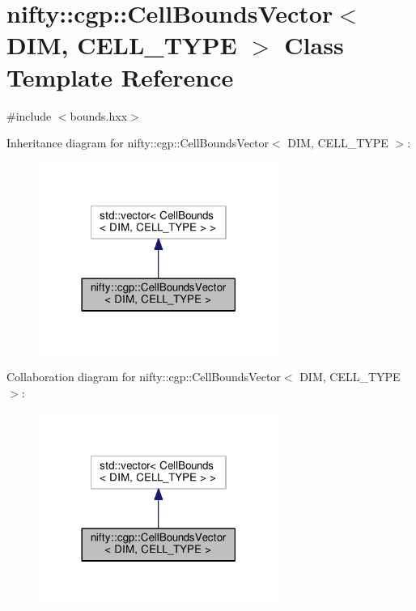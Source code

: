 \hypertarget{classnifty_1_1cgp_1_1CellBoundsVector}{}\section{nifty\+:\+:cgp\+:\+:Cell\+Bounds\+Vector$<$ D\+I\+M, C\+E\+L\+L\+\_\+\+T\+Y\+P\+E $>$ Class Template Reference}
\label{classnifty_1_1cgp_1_1CellBoundsVector}


{\ttfamily \#include $<$bounds.\+hxx$>$}



Inheritance diagram for nifty\+:\+:cgp\+:\+:Cell\+Bounds\+Vector$<$ D\+I\+M, C\+E\+L\+L\+\_\+\+T\+Y\+P\+E $>$\+:\nopagebreak
\begin{figure}[H]
\begin{center}
\leavevmode
\includegraphics[width=222pt]{classnifty_1_1cgp_1_1CellBoundsVector__inherit__graph}
\end{center}
\end{figure}


Collaboration diagram for nifty\+:\+:cgp\+:\+:Cell\+Bounds\+Vector$<$ D\+I\+M, C\+E\+L\+L\+\_\+\+T\+Y\+P\+E $>$\+:\nopagebreak
\begin{figure}[H]
\begin{center}
\leavevmode
\includegraphics[width=222pt]{classnifty_1_1cgp_1_1CellBoundsVector__coll__graph}
\end{center}
\end{figure}

